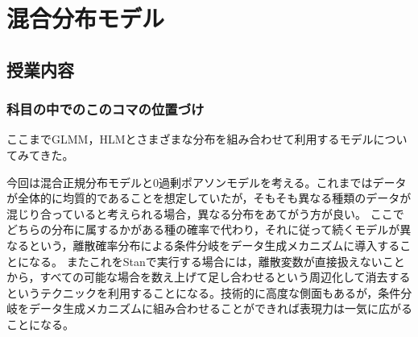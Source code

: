 \section{混合分布モデル}
\label{lesson2_26}
\subsection{授業内容}
\subsubsection{科目の中でのこのコマの位置づけ}
ここまでGLMM，HLMとさまざまな分布を組み合わせて利用するモデルについてみてきた。

今回は混合正規分布モデルと0過剰ポアソンモデルを考える。これまではデータが全体的に均質的であることを想定していたが，そもそも異なる種類のデータが混じり合っていると考えられる場合，異なる分布をあてがう方が良い。
ここでどちらの分布に属するかがある種の確率で代わり，それに従って続くモデルが異なるという，離散確率分布による条件分岐をデータ生成メカニズムに導入することになる。
またこれをStanで実行する場合には，離散変数が直接扱えないことから，すべての可能な場合を数え上げて足し合わせるという周辺化して消去するというテクニックを利用することになる。技術的に高度な側面もあるが，条件分岐をデータ生成メカニズムに組み合わせることができれば表現力は一気に広がることになる。
